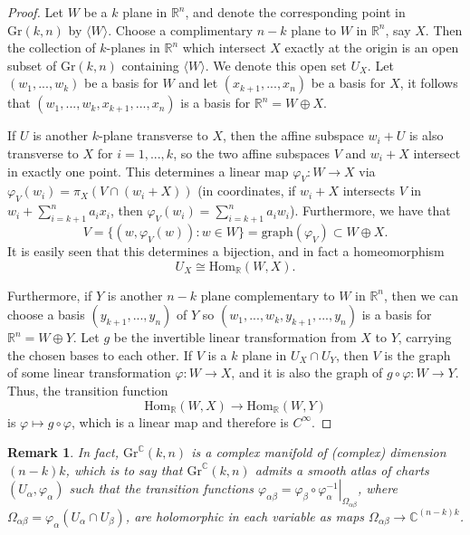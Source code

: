 \documentclass{amsart}          %
\newtheorem{remark}[theorem]{Remark}
\newcommand{\C}{\mathbb C}
\newcommand{\Gr}{\mathrm{Gr}}
\begin{document}
\begin{proof}
	Let $W$ be a $k$ plane in $\mathbb{R}^n$, and denote the corresponding point in $\Gr(k, n)$ by $\langle W\rangle$. Choose a complimentary $n-k$ plane to $W$ in $\mathbb{R}^n$, say $X$. Then the collection of $k$-planes in $\mathbb{R}^n$ which intersect $X$ exactly at the origin is an open subset of $\Gr(k, n)$ containing $\langle W\rangle$. We denote this open set $U_X$. Let $(w_1, ..., w_k)$ be a basis for $W$ and let $(x_{k+1}, ..., x_n)$ be a basis for $X$, it follows that $(w_1, ..., w_k, x_{k+1}, ..., x_n)$ is a basis for $\mathbb{R}^n = W\oplus X$. 
	
	If $U$ is another $k$-plane transverse to $X$, then the affine subspace $w_i + U$ is also transverse to $X$ for $i= 1, ..., k$, so the two affine subspaces $V$ and $w_i + X$ intersect in exactly one point. This determines a linear map $\varphi_V: W\rightarrow X$ via $\varphi_V(w_i) = \pi_X(V\cap (w_i+ X))$ (in coordinates, if $w_i + X$ intersects $V$ in $w_i + \sum_{i=k+1}^na_ix_i$, then $\varphi_V(w_i) = \sum_{i=k+1}^na_iw_i$). Furthermore, we have that 
	\[
	V = \lbrace(w, \varphi_V(w)) : w\in W\rbrace = \text{graph}(\varphi_V)\subset W\oplus X.
	\]
It is easily seen that this determines a bijection, and in fact a homeomorphism 
\[
U_X\cong \text{Hom}_{\mathbb{R}}(W, X).
\]	

Furthermore, if $Y$ is another $n-k$ plane complementary to $W$ in $\mathbb{R}^n$, then we can choose a basis $(y_{k+1}, ..., y_n)$ of $Y$ so $(w_1, ..., w_k, y_{k+1}, ..., y_n)$ is a basis for $\mathbb{R}^n= W\oplus Y$.  Let $g$ be the invertible linear transformation from $X$ to $Y$, carrying the chosen bases to each other. If $V$ is a $k$ plane in $U_X\cap U_Y$, then $V$ is the graph of some linear transformation $\varphi: W\rightarrow X$,  and it is also the graph of $g\circ \varphi : W\rightarrow Y$. Thus, the transition function 
\[
\text{Hom}_{\mathbb{R}}(W, X)\rightarrow \text{Hom}_{\mathbb{R}}(W, Y)
\]
is $\varphi\mapsto g\circ \varphi$, which is a linear map and therefore is $C^{\infty}$. 
\end{proof}
\begin{remark}
	In fact, $\Gr^\C(k,n)$ is a complex manifold of (complex) dimension $(n-k)k$, which is to say that $\Gr^\C(k,n)$ admits a smooth atlas of charts $(U_\alpha,\varphi_\alpha)$ such that the transition functions $\varphi_{\alpha\beta}=\left.\varphi_\beta\circ\varphi_{\alpha}^{-1}\right|_{\Omega_{\alpha\beta}}$, where $\Omega_{\alpha\beta}=\varphi_\alpha(U_\alpha\cap U_\beta)$, are holomorphic in each variable as maps $\Omega_{\alpha\beta}\to\C^{(n-k)k}$.
\end{remark}
\end{document}
